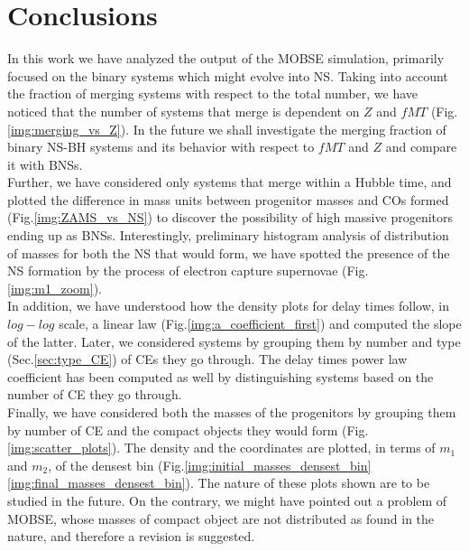 \documentclass[preprint,12pt]{elsarticle}
\begin{document}
\newpage

\section{Conclusions}
In this work we have analyzed the output of the MOBSE simulation, primarily focused on the binary systems which might evolve into NS. Taking into account the fraction of merging systems with respect to the total number, we have noticed that the number of systems that merge is dependent on $Z$ and $fMT$ (Fig.\ref{img:merging_vs_Z}). In the future we shall investigate the merging fraction of binary NS-BH systems and its behavior with respect to $fMT$ and $Z$ and compare it with BNSs.\\

Further, we have considered only systems that merge within a Hubble time, and plotted the difference in mass units between progenitor masses and COs formed (Fig.\ref{img:ZAMS_vs_NS}) to discover the possibility of high massive progenitors ending up as BNSs. Interestingly, preliminary histogram analysis of distribution of masses for both the NS that would form, we have spotted the presence of the NS formation by the process of electron capture supernovae (Fig.\ref{img:m1_zoom}).\\ 

In addition, we have understood how the density plots for delay times follow, in $log-log$ scale, a linear law (Fig.\ref{img:a_coefficient_first}) and computed the slope of the latter. Later, we considered systems by grouping them by number and type (Sec.\ref{sec:type_CE}) of CEs they go through. The delay times power law coefficient has been computed as well by distinguishing systems based on the number of CE they go through.\\

Finally, we have considered both the masses of the progenitors by grouping them by number of CE and the compact objects they would form (Fig.\ref{img:scatter_plots}). The density and the coordinates are plotted, in terms of $m_1$ and $m_2$, of the densest bin (Fig.\ref{img:initial_masses_densest_bin} \ref{img:final_masses_densest_bin}). The nature of these plots shown are to be studied in the future. On the contrary, we might have pointed out a problem of MOBSE, whose masses of compact object are not distributed as found in the nature, and therefore a revision is suggested.




\end{document}
